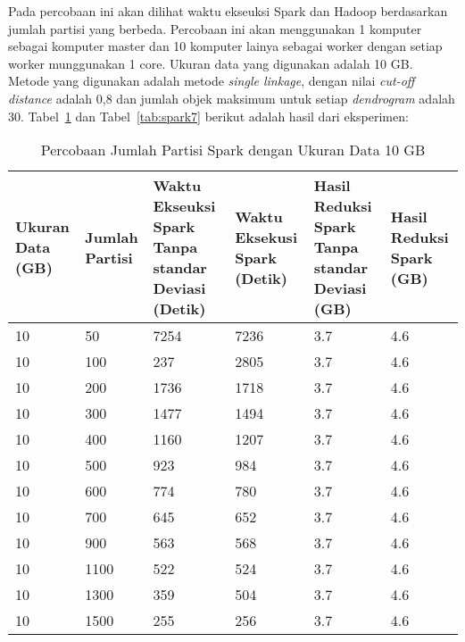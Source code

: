 


Pada percobaan ini akan dilihat waktu ekseuksi Spark dan Hadoop berdasarkan jumlah partisi yang berbeda. Percobaan ini akan menggunakan 1 komputer sebagai komputer master dan 10 komputer lainya sebagai worker dengan setiap worker munggunakan 1 core. Ukuran data yang digunakan adalah 10 GB. Metode yang digunakan adalah metode \textit{single linkage}, dengan nilai \textit{cut-off distance} adalah 0,8 dan jumlah objek maksimum untuk setiap \textit{dendrogram} adalah 30. Tabel~\ref{tab:spark6} dan Tabel~\ref{tab:spark7} berikut adalah hasil dari eksperimen:

\begin{table}[H] 
	\centering 
	\caption{Percobaan Jumlah Partisi Spark dengan Ukuran Data 10 GB}
	\label{tab:spark6}
	\begin{tabular}{|p{1cm}|p{1cm}|p{3cm}|p{3cm}|p{3cm}|p{3cm}|}
\hline
Ukuran Data (GB) & Jumlah Partisi &  Waktu Ekseuksi Spark Tanpa standar Deviasi (Detik) & Waktu Eksekusi Spark (Detik) & Hasil Reduksi Spark Tanpa standar Deviasi (GB) & Hasil Reduksi Spark (GB)  \\ 
\hline
10 & 50 & 7254 & 7236 & 3.7 & 4.6 \\
\hline
10 & 100 & 237 & 2805 &  3.7 & 4.6 \\
\hline
10 & 200 & 1736 & 1718 & 3.7 & 4.6 \\
\hline
10 & 300 & 1477 & 1494 & 3.7 & 4.6 \\
\hline
10 & 400 & 1160 & 1207 & 3.7 & 4.6 \\
\hline
10 & 500 & 923 & 984 &  3.7 & 4.6 \\
\hline
10 & 600 & 774 & 780 & 3.7 & 4.6 \\
\hline
10 & 700 & 645 & 652 & 3.7 & 4.6 \\
\hline
10 & 900 & 563 & 568 & 3.7 & 4.6 \\
\hline
10 & 1100 & 522 & 524 & 3.7 & 4.6 \\
\hline
10 & 1300 & 359 & 504 & 3.7 & 4.6 \\
\hline
10 & 1500 & 255 & 256 & 3.7 & 4.6 \\
\hline


\hline

	\end{tabular} 
\end{table}



